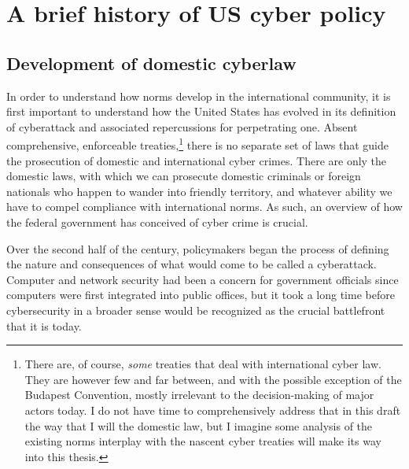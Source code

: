 \documentclass[12pt]{article}
\begin{document}
\section{A brief history of US cyber policy}
\subsection{Development of domestic cyberlaw}
In order to understand how norms develop in the international community, it is first important to understand how the United States has evolved in its definition of cyberattack and associated repercussions for perpetrating one. Absent comprehensive, enforceable treaties,\footnote{There are, of course, \emph{some} treaties that deal with international cyber law. They are however few and far between, and with the possible exception of the Budapest Convention, mostly irrelevant to the decision-making of major actors today. I do not have time to comprehensively address that in this draft the way that I will the domestic law, but I imagine some analysis of the existing norms interplay with the nascent cyber treaties will make its way into this thesis.} there is no separate set of laws that guide the prosecution of domestic and international cyber crimes. There are only the domestic laws, with which we can prosecute domestic criminals or foreign nationals who happen to wander into friendly territory, and whatever ability we have to compel compliance with international norms. As such, an overview of how the federal government has conceived of cyber crime is crucial.

Over the second half of the  century, policymakers began the process of defining the nature and consequences of what would come to be called a cyberattack. Computer and network security had been a concern for government officials since computers were first integrated into public offices, but it took a long time before cybersecurity in a broader sense would be recognized as the crucial battlefront that it is today. 
\end{document}
